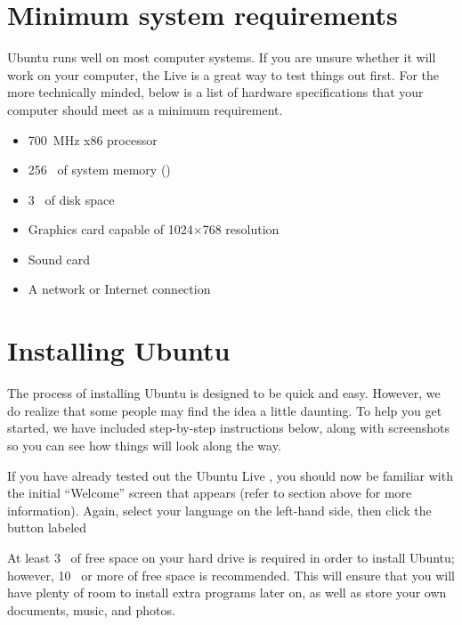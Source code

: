 \section{Minimum system requirements}
Ubuntu runs well on most computer systems. If you are unsure whether it will work on your computer, the Live  is a great way to test things out first. For the more technically minded, below is a list of hardware specifications that your computer should meet as a minimum requirement.
\begin{itemize}
  \item 700~MHz x86 processor
  \item 256~ of system memory ()
  \item 3~ of disk space
  \item Graphics card capable of 1024$\times$768 resolution
  \item Sound card
  \item A network or Internet connection
\end{itemize}

\section{Installing Ubuntu}

The process of installing Ubuntu is designed to be quick and easy. However, we do realize that some people may find the idea a little daunting. To help you get started, we have included step-by-step instructions below, along with screenshots so you can see how things will look along the way.

If you have already tested out the Ubuntu Live , you should now be familiar with the initial ``Welcome'' screen that appears (refer to  section above for more information). Again, select your language on the left-hand side, then click the button labeled 

At least 3~ of free space on your hard drive is required in order to install Ubuntu; however, 10~ or more of free space is recommended. This will ensure that you will have plenty of room to install extra programs later on, as well as store your own documents, music, and photos. 

